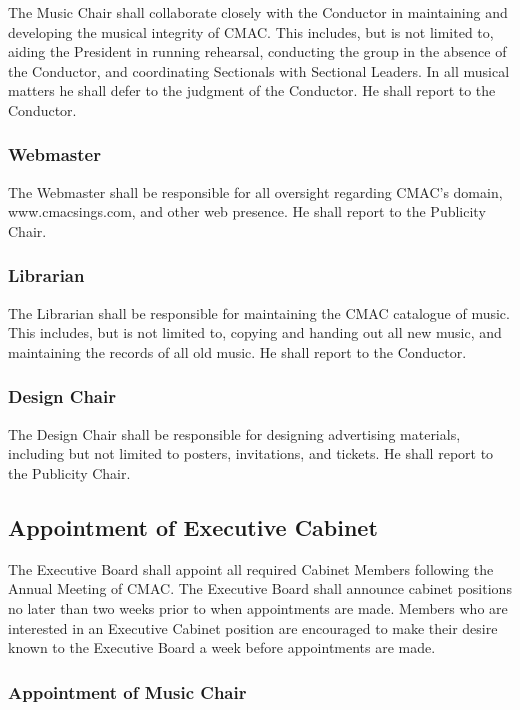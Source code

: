\documentclass{article}
\begin{document}
The Music Chair shall collaborate closely with the Conductor in maintaining
and developing the musical integrity of CMAC. This includes, but is
not limited to, aiding the President in running rehearsal, conducting
the group in the absence of the Conductor, and coordinating Sectionals
with Sectional Leaders. In all musical matters he shall defer to the
judgment of the Conductor. He shall report to the Conductor.


\subsubsection{Webmaster}

The Webmaster shall be responsible for all oversight regarding CMAC's
domain, www.cmacsings.com, and other web presence. He shall report to the
Publicity Chair.


\subsubsection{Librarian}

The Librarian shall be responsible for maintaining the CMAC catalogue
of music. This includes, but is not limited to, copying and handing
out all new music, and maintaining the records of all old music. He
shall report to the Conductor.


\subsubsection{Design Chair}

The Design Chair shall be responsible for designing advertising materials,
including but not limited to posters, invitations, and tickets. He
shall report to the Publicity Chair.

\subsection{Appointment of Executive Cabinet}

The Executive Board shall appoint all required Cabinet Members following the
Annual Meeting of CMAC. The Executive Board shall announce cabinet positions no
later than two weeks prior to when appointments are made. Members who are
interested in an Executive Cabinet position are encouraged to make their desire
known to the Executive Board a week before appointments are made.

\subsubsection{Appointment of Music Chair}
\end{document}
